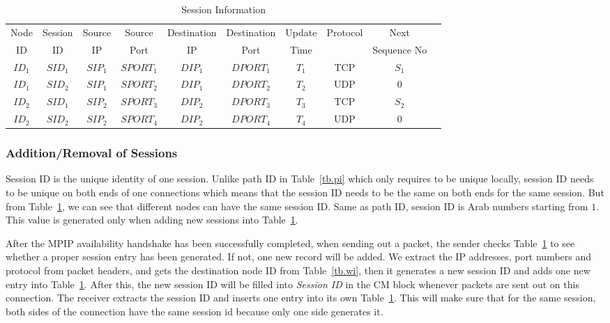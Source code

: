 \begin{table}
\caption{\label{tb.ss}Session Information}
\centering
\begin{tabular}{|c|c|c|c|c|c|c|c|c|c|}
\hline
Node  & Session &  Source &  Source & Destination & Destination & Update  & Protocol  &    Next      \\
  ID  &   ID    &    IP   &   Port  &     IP      &    Port     &  Time   &           &  Sequence No \\
\hline
${ID}_1$&${SID}_1$&${SIP}_{1}$&${SPORT}_{1}$&${DIP}_{1}$&${DPORT}_{1}$&$T_1$&TCP&$S_1$               \\
\hline
${ID}_1$&${SID}_2$&${SIP}_{1}$&${SPORT}_{2}$&${DIP}_{1}$&${DPORT}_{2}$&$T_2$&UDP&$0$                 \\
\hline
${ID}_2$&${SID}_1$&${SIP}_{2}$&${SPORT}_{3}$&${DIP}_{2}$&${DPORT}_{3}$&$T_3$&TCP&$S_2$              \\
\hline
${ID}_2$&${SID}_2$&${SIP}_{2}$&${SPORT}_{4}$&${DIP}_{2}$&${DPORT}_{4}$&$T_4$&UDP&$0$                 \\
\hline
\end{tabular}
\end{table}


\subsubsection{Addition/Removal of Sessions}

Session ID is the unique identity of one session. Unlike path ID in Table~\ref{tb.pi} which only requires to be unique locally, session ID needs to be unique on both ends of one connections which means that the session ID needs to be the same on both ends for the same session. But from Table~\ref{tb.ss}, we can see that different nodes can have the same session ID. Same as path ID, session ID is Arab numbers starting from $1$. This value is generated only when adding new sessions into Table~\ref{tb.ss}.

After the MPIP availability handshake has been successfully completed, when sending out a packet, the sender checks Table~\ref{tb.ss} to see whether a proper session entry has been generated. If not, one new record will be added. We extract the IP addresses, port numbers and protocol from packet headers, and gets the destination node ID from Table~\ref{tb.wi}, then it generates a new session ID and adds one new entry into Table~\ref{tb.ss}. After this, the new session ID will be filled into \emph{Session ID} in the CM block whenever packets are sent out on this connection. The receiver extracts the session ID and inserts one entry into its own Table~\ref{tb.ss}. This will make sure that for the same session, both sides of the connection have the same session id because only one side generates it.

